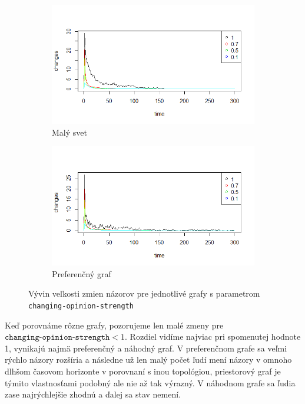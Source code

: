 \documentclass[10pt,a4paper]{report}
\begin{document}
\begin{figure}
    \begin{subfigure}[b]{0.475\textwidth}  
      \centering 
      \includegraphics[width=\textwidth]{plots/spatial-g/ChangesOneSpatial.png}
      \caption[]%
      {{\small Malý svet}}    
      \label{fig:zmeny-maly svet}
  \end{subfigure}
  \quad
  \begin{subfigure}[b]{0.475\textwidth}   
      \centering 
      \includegraphics[width=\textwidth]{plots/prefferential-g/changesPrefferential.png}
      \caption[]%
      {{\small Preferenčný graf}}    
      \label{fig:zmeny-preferencni}
  \end{subfigure}
  \caption[ Vývin zmien pre jednotlivé grafy so zmenou parametru ]
  {\small Vývin veľkosti zmien názorov pre jednotlivé grafy s parametrom \texttt{changing-opinion-strength}}
  \label{fig:zmeny-grafy}
\end{figure}
Keď porovnáme rôzne grafy, pozorujeme len malé zmeny pre $\texttt{changing-opinion-strength} < 1$. Rozdiel vidíme najviac pri spomenutej hodnote 1, vynikajú najmä preferenčný a náhodný graf. V preferenčnom grafe sa veľmi rýchlo názory rozšíria a následne už len malý počet ľudí mení názory v omnoho dlhšom časovom horizonte v porovnaní s inou topológiou, priestorový graf je týmito vlastnosťami podobný ale nie až tak výrazný. V náhodnom grafe sa ľudia zase najrýchlejšie zhodnú a ďalej sa stav nemení.
\end{document}
